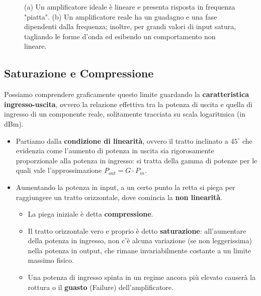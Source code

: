 \documentclass[openany,a4paper,12pt]{book}
\begin{document}
\begin{figure}[H]
{%
    }
    \caption*{(a) Un amplificatore ideale è lineare e presenta risposta in frequenza "piatta". (b) Un amplificatore reale ha un guadagno e una fase dipendenti dalla frequenza; inoltre, per grandi valori di input satura, tagliando le forme d'onda ed esibendo un comportamento non lineare.}
\end{figure}

\subsection*{Saturazione e Compressione}

Possiamo comprendere graficamente questo limite guardando la \textbf{caratteristica ingresso-uscita}, ovvero la relazione effettiva tra la potenza di uscita e quella di ingresso di un componente reale, solitamente tracciata su scala logaritmica (in dBm).

\begin{itemize}[label=\textcolor{PoliBlue}{\textbullet}]
    \item Partiamo dalla \textbf{condizione di linearità}, ovvero il tratto inclinato a $45^\circ$ che evidenzia come l'aumento di potenza in uscita sia rigorosamente proporzionale alla potenza in ingresso: si tratta della gamma di potenze per le quali vale l'approssimazione $P_{out} = G \cdot P_{in}$.
    \item Aumentando la potenza in input, a un certo punto la retta si piega per raggiungere un tratto orizzontale, dove comincia la \textbf{non linearità}.
    \begin{itemize}[label=\textcolor{OpticRed}{\textbullet}]
        \item La piega iniziale è detta \textbf{compressione}. 
        \item Il tratto orizzontale vero e proprio è detto \textbf{saturazione}: all'aumentare della potenza in ingresso, non c'è alcuna variazione (se non leggerissima) nella potenza in output, che rimane invariabilmente costante a un limite massimo fisico.
        \item Una potenza di ingresso spinta in un regime ancora più elevato causerà la rottura o il \textbf{guasto} (Failure) dell'amplificatore.
    \end{itemize}
\end{itemize}
\end{document}
